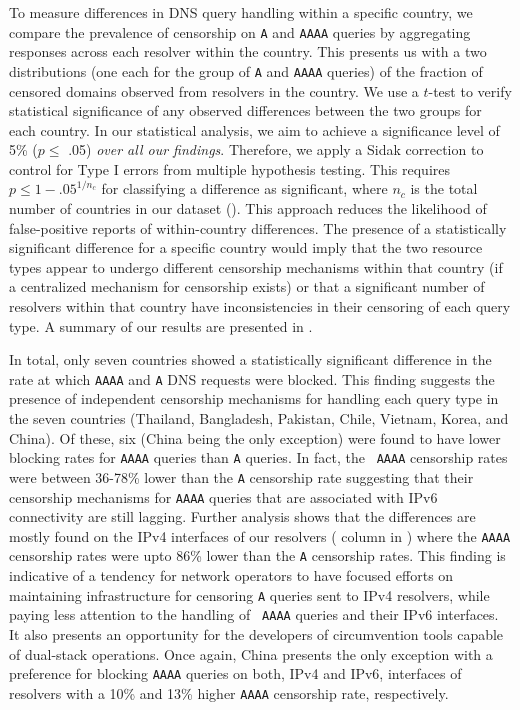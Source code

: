 To measure differences in DNS query handling within a specific country, we
compare the prevalence of censorship on {\tt A} and {\tt AAAA} queries by
aggregating responses across {each resolver within the country}. This presents
us with a two distributions (one each for the group of {\tt A} and {\tt AAAA}
queries) of the fraction of censored domains observed from resolvers in the
country.
%
We use a $t$-test to verify statistical significance of any observed
differences between the two groups for each country. In our statistical
analysis, we aim to achieve a significance level of 5\% ($p \leq$  .05)
\emph{over all our findings}. Therefore, we apply a Sidak correction
\cite{abdi2007bonferroni} to control for Type I errors from multiple hypothesis
testing. 
%
This requires $p \leq 1-{.05}^{1/n_{c}}$ for classifying a difference as
significant, where $n_c$ is the total number of countries in our dataset
(). This approach reduces the likelihood of false-positive reports
of within-country differences.
%
The presence of a statistically significant difference for a specific country
would imply that the two resource types appear to undergo different censorship
mechanisms within that country (if a centralized mechanism for censorship
exists) or that a significant number of resolvers within that country have
inconsistencies in their censoring of each query type.
%
A summary of our results are presented in . 

%
In total, only seven countries showed a statistically significant difference
in the rate at which {\tt AAAA} and {\tt A} DNS requests were blocked. 
%
This finding suggests the presence of independent censorship mechanisms for
handling each query type in the seven countries (Thailand, Bangladesh,
Pakistan, Chile, Vietnam, Korea, and China).
%
Of these, six (China being the only exception) were found to have lower
blocking rates for {\tt AAAA} queries than {\tt A} queries. In fact, the {\tt
AAAA} censorship rates were between 36-78\% lower than the {\tt A} censorship
rate suggesting that their censorship mechanisms for {\tt AAAA} queries that
are associated with IPv6 connectivity are still lagging. 
%
Further analysis shows that the differences are mostly found on the IPv4
interfaces of our resolvers ( column in
) where the {\tt AAAA} censorship rates were upto
86\% lower than the {\tt A} censorship rates. 
%
This finding is indicative of a tendency for network operators to have
focused efforts on maintaining infrastructure for censoring {\tt A} queries
sent to IPv4 resolvers, while paying less attention to the handling of {\tt
AAAA} queries and their IPv6 interfaces. It also presents an opportunity for
the developers of circumvention tools capable of dual-stack operations.
%
Once again, China presents the only exception with a preference for blocking
{\tt AAAA} queries on both, IPv4 and IPv6, interfaces of resolvers with a 10\%
and 13\% higher {\tt AAAA} censorship rate, respectively.

